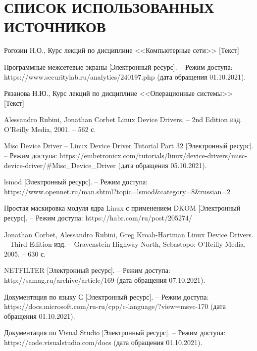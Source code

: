 \section*{СПИСОК ИСПОЛЬЗОВАННЫХ ИСТОЧНИКОВ}

\begin{thebibliography}{9}
	 Рогозин Н.О., Курс лекций по дисциплине <<Компьютерные сети>> [Текст]
	
	 Программные межсетевые экраны [Электронный ресурс]. -- Режим доступа: https://www.securitylab.ru/analytics/240197.php (дата обращения 01.10.2021).
	
	 Рязанова Н.Ю., Курс лекций по дисциплине <<Операционные системы>> [Текст]
	
	 Alessandro Rubini, Jonathan Corbet Linux Device Drivers. -- 2nd Edition изд. O'Reilly Media, 2001. -- 562 с.
	
	 Misc Device Driver -- Linux Device Driver Tutorial Part 32 [Электронный ресурс]. --  Режим доступа: https://embetronicx.com/tutorials/linux/device-drivers/misc-device-driver/\#Misc\_Device\_Driver (дата обращения 05.10.2021).
	
	 lsmod [Электронный ресурс]. -- Режим доступа: https://www.opennet.ru/man.shtml?topic=lsmod\&category=8\&russian=2
	
	 Простая маскировка модуля ядра Linux с применением DKOM [Электронный ресурс]. -- Режим доступа: https://habr.com/ru/post/205274/
	
	 Jonathan Corbet, Alessandro Rubini, Greg Kroah-Hartman Linux Device Drivers. -- Third Edition изд. --  Gravenstein Highway North, Sebastopo:  O’Reilly Media, 2005. -- 630 с.
	
	 NETFILTER [Электронный ресурс]. -- Режим доступа: http://samag.ru/archive/article/169 (дата обращения 07.10.2021).
	
	 Документвция по языку С [Электронный ресурс]. -- Режим доступа: https://docs.microsoft.com/ru-ru/cpp/c-language/?view=msvc-170 (дата обращения 01.10.2021).
	
	 Документация по Visual Studio [Электронный ресурс]. -- Режим доступа:  https://code.visualstudio.com/docs (дата обращения 01.10.2021).
	
\end{thebibliography}
		
		
